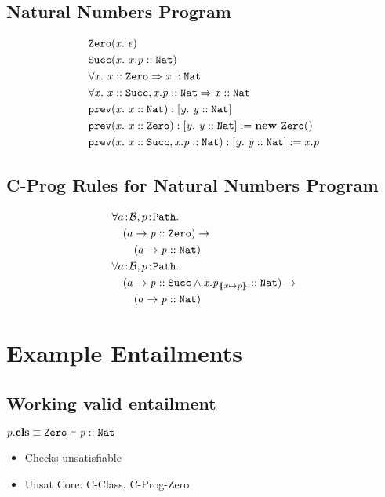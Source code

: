 \documentclass[a4paper]{article}
\begin{document}
\subsection{Natural Numbers Program}
\begin{align}
&\mathit{\texttt{Zero}}(\mathit{x}.\ \mathit{\epsilon})\\
&\mathit{\texttt{Succ}}(\mathit{x}.\ \mathit{\mathit{x.p} :: \mathit{\texttt{Nat}}})\\
& \forall \mathit{x}.\ \mathit{\mathit{x} :: \mathit{\texttt{Zero}}} \Rightarrow \mathit{\mathit{x} :: \mathit{\texttt{Nat}}}\\
& \forall \mathit{x}.\ \mathit{\mathit{x} :: \mathit{\texttt{Succ}}, \mathit{x.p} :: \mathit{\texttt{Nat}}} \Rightarrow \mathit{\mathit{x} :: \mathit{\texttt{Nat}}}\\
&\mathit{\texttt{prev}}(\mathit{x}.\ \mathit{\mathit{x} :: \mathit{\texttt{Nat}}}): \mathit{[y.\ \mathit{\mathit{y} :: \mathit{\texttt{Nat}}}]}\\
&\mathit{\texttt{prev}}(\mathit{x}.\ \mathit{\mathit{x} :: \mathit{\texttt{Zero}}}): \mathit{[y.\ \mathit{\mathit{y} :: \mathit{\texttt{Nat}}}]} := \mathit{\textbf{new } \mathit{\texttt{Zero}}()}\\
&\mathit{\texttt{prev}}(\mathit{x}.\ \mathit{\mathit{x} :: \mathit{\texttt{Succ}}, \mathit{x.p} :: \mathit{\texttt{Nat}}}): \mathit{[y.\ \mathit{\mathit{y} :: \mathit{\texttt{Nat}}}]} := \mathit{x.p}
\end{align}

\subsection{C-Prog Rules for Natural Numbers Program}
\begin{align}
  &\forall \sortedVar{a}{\TBool}, \sortedVar{p}{\Path}.\\
  &\quad (a \rightarrow \instOf{p}{\Zero}) \rightarrow\\
  &\qquad (a \rightarrow \instOf{p}{\Nat})\\
  &\forall \sortedVar{a}{\TBool}, \sortedVar{p}{\Path}.\\
  &\quad (a \rightarrow \instOf{p}{\Succ} \land \instOf{x.p_{\sub{x}{p}}}{\Nat}) \rightarrow\\
  &\qquad (a \rightarrow \instOf{p}{\Nat})
\end{align}

\section{Example Entailments}
\subsection{Working valid entailment}
$\mathit{p}.\textbf{cls} \equiv \mathit{\mathtt{Zero}} \vdash \mathit{p} :: \mathit{\mathtt{Nat}}$
\begin{itemize}
  \item Checks unsatisfiable
  \item Unsat Core: C-Class, C-Prog-Zero
\end{itemize}
\end{document}
